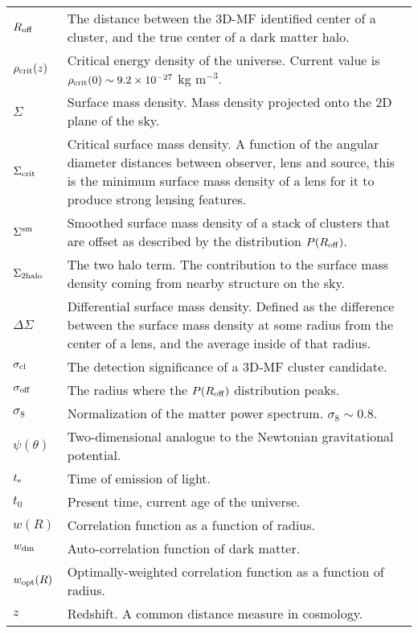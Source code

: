 \section*{\underline{}}
\vspace{-0.5cm}
\begin{tabular}{p{0.6in}p{5.8in}}

$R_{\rm off}$ & The distance between the \acs{3D-MF} identified center of a cluster, and the true center of a dark matter halo. \\
$\rho_{\rm crit}(z)$ & Critical energy density of the universe. Current value is $\rho_{\rm crit}(0) \sim 9.2 \times 10^{-27}$ kg m$^{-3}$. \\
$\Sigma$ & Surface mass density. Mass density projected onto the 2D plane of the sky. \\
$\Sigma_{\rm crit}$ & Critical surface mass density. A function of the angular diameter distances between observer, lens and source, this is the minimum surface mass density of a lens for it to produce strong lensing features. \\
$\Sigma^{\rm sm}$ & Smoothed surface mass density of a stack of clusters that are offset as described by the distribution $P(R_{\rm off})$. \\
$\Sigma_{\rm 2halo}$ & The two halo term. The contribution to the surface mass density coming from nearby structure on the sky. \\
$\Delta\Sigma$ & Differential surface mass density. Defined as the difference between the surface mass density at some radius from the center of a lens, and the average inside of that radius. \\
$\sigma_{\rm cl}$ & The detection significance of a \acs{3D-MF} cluster candidate. \\
$\sigma_{\rm off}$ & The radius where the $P(R_{\rm off})$ distribution peaks. \\
$\sigma_8$ & Normalization of the matter power spectrum.  $\sigma_8 \sim 0.8$. \\
$\psi(\theta)$ & Two-dimensional analogue to the Newtonian gravitational potential. \\
$t_{\rm e}$ & Time of emission of light. \\
$t_0$ & Present time, current age of the universe. \\
$w(R)$ & Correlation function as a function of radius. \\
$w_{\rm dm}$ & Auto-correlation function of dark matter. \\
$w_{\rm opt}(R)$ & Optimally-weighted correlation function as a function of radius. \\
$z$ & Redshift. A common distance measure in cosmology. \\

\end{tabular}



